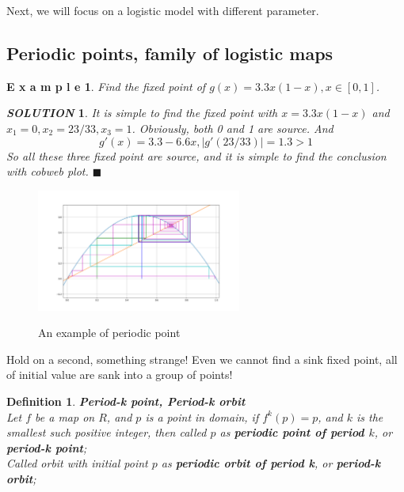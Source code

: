 \documentclass[12pt]{article}
\theoremstyle{plain}
\newtheorem{definition}{\textbf{Definition}}[section]
\newtheorem{example}{\textbf{E x a m p l e}}[section]
\newtheorem{solution}{\textit{SOLUTION}}[section]
\begin{document}
Next, we will focus on a logistic model with different parameter.








\subsection{Periodic points, family of logistic maps}
\begin{example} Find the fixed point of $g(x) = 3.3x(1-x), x \in [0, 1]$.
\end{example}

{\color{blue}
\begin{solution}
It is simple to find the fixed point with $x = 3.3x(1-x)$ and $x_1 = 0, x_2 = 23/33, x_3 = 1$. Obviously, both 0 and 1 are source. And
$$
g'(x) = 3.3 - 6.6x, |g'(23/33)| = 1.3 > 1
$$ 
So all these three fixed point are source, and it is simple to find the conclusion with cobweb plot. $\blacksquare$
\end{solution}
}

\newpage
\begin{figure}[H]
\begin{center}
\includegraphics[width=0.6\textwidth]{figure/section1/periodic-point.png} \\
\caption{An example of periodic point}\label{periodic-point}
\end{center}
\end{figure}


Hold on a second, something strange! Even we cannot find a sink fixed point, all of initial value are sank into a group of points!

\begin{definition}\textbf{Period-k point, Period-k orbit}
\\\noindent Let $f$ be a map on $R$, and $p$ is a point in domain, if $f^k(p) = p$, and $k$ is the smallest such positive integer, then called $p$ as \textbf{periodic point of period $k$}, or \textbf{period-k point};
\\\noindent Called orbit with initial point $p$ as \textbf{periodic orbit of period k}, or \textbf{period-k orbit};
\end{definition}
\end{document}
